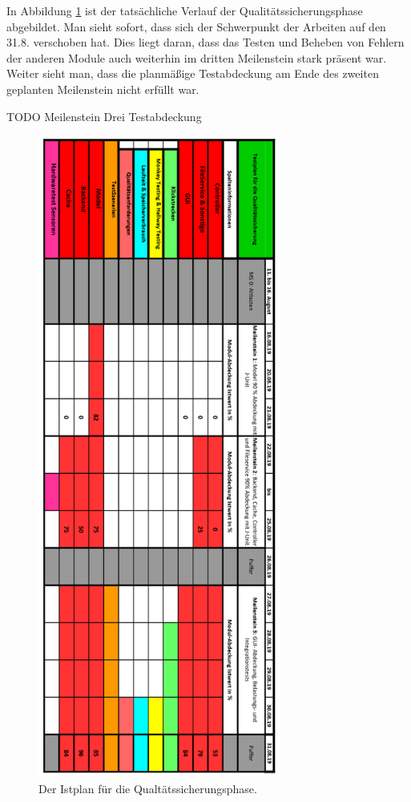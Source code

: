 \documentclass[parskip=full]{scrartcl}
\begin{document}
In Abbildung \ref{istplan} ist der tatsächliche Verlauf der Qualitätssicherungsphase abgebildet. Man sieht sofort, dass sich der Schwerpunkt der Arbeiten auf den 31.8. verschoben hat. Dies liegt daran, dass das Testen und Beheben von Fehlern der anderen Module auch weiterhin im dritten Meilenstein stark präsent war. Weiter sieht man, dass die planmäßige Testabdeckung am Ende des zweiten geplanten Meilenstein nicht erfüllt war. 

TODO Meilenstein Drei Testabdeckung

\begin{figure}[htbp]
	\begin{center}
		\includegraphics[width = 8cm]{Grafiken/istplan.png}
		\caption{Der Istplan für die Qualtätssicherungsphase.}
		\label{istplan}
	\end{center}
\end{figure}
\end{document}
